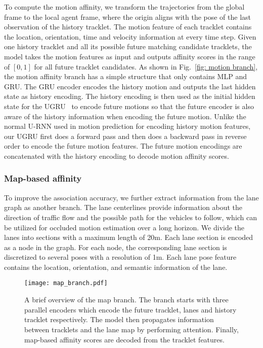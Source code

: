 \documentclass{article} \usepackage{iclr2023_conference,times}
\begin{document}
To compute the motion affinity, we transform the trajectories from the global frame to the local agent frame, where the origin aligns with the pose of the last observation of the history tracklet. The motion feature of each tracklet contains the location, orientation, time and velocity information at every time step. Given one history tracklet and all its possible future matching candidate tracklets, the model takes the motion features as input and outputs affinity scores in the range of $[0,1]$ for all future tracklet candidates. As shown in Fig.~\ref{fig: motion branch}, the motion affinity branch has a simple structure that only contains MLP and GRU. The GRU encoder encodes the history motion and outputs the last hidden state as history encoding. The history encoding is then used as the initial hidden state for the UGRU~\cite{urnn} to encode future motions so that the future encoder is also aware of the history information when encoding the future motion. Unlike the normal U-RNN used in motion prediction for encoding history motion features, our UGRU first does a forward pass and then does a backward pass in reverse order to encode the future motion features. The future motion encodings are concatenated with the history encoding to decode motion affinity scores. 
\vspace{-1mm}
\subsubsection{Map-based affinity}
\vspace{-1mm}
\label{sec: map affinity}
To improve the association accuracy, we further extract information from the lane graph as another branch. The lane centerlines provide information about the direction of traffic flow and the possible path for the vehicles to follow, which can be utilized for occluded motion estimation over a long horizon. We divide the lanes into sections with a maximum length of 20m. Each lane section is encoded as a node in the graph. For each node, the corresponding lane section is discretized to several poses with a resolution of 1m. Each lane pose feature contains the location, orientation, and semantic information of the lane. 

\begin{figure*}[ht]
\centering
\texttt{[image: map\_branch.pdf]}
\caption{A brief overview of the map branch. The branch starts with three parallel encoders which encode the future tracklet, lanes and history tracklet respectively. The model then propagates information between tracklets and the lane map by performing attention. Finally, map-based affinity scores are decoded from the tracklet features.}
\label{fig: map branch}
\end{figure*}
\end{document}
